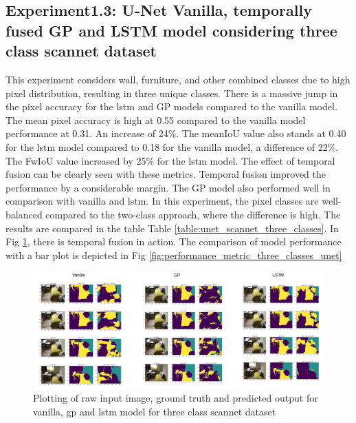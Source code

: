     \subsection{Experiment1.3: U-Net Vanilla, temporally fused GP and LSTM model considering three class scannet dataset}
	
	This experiment considers wall, furniture, and other combined classes due to high pixel distribution, resulting in three unique classes. There is a massive jump in the pixel accuracy for the lstm and GP models compared to the vanilla model. The mean pixel accuracy is high at 0.55 compared to the vanilla model performance at 0.31. An increase of 24\%. The meanIoU value also stands at 0.40 for the lstm model compared to 0.18 for the vanilla model, a difference of 22\%. The FwIoU value increased by 25\% for the lstm model. The effect of temporal fusion can be clearly seen with these metrics. Temporal fusion improved the performance by a considerable margin. The GP model also performed well in comparison with vanilla and lstm. In this experiment, the pixel classes are well-balanced compared to the two-class approach, where the difference is high. The results are compared in the table Table \ref{table:unet_scannet_three_classes}. In Fig \ref{fig:performance_metric_three_classes_scannet}, there is temporal fusion in action. The comparison of model performance with a bar plot is depicted in Fig \ref{fig:performance_metric_three_classes_unet}
	
	\begin{figure}
		\centering
		\includegraphics[width=16cm]{images/unet_scannet_three_classes.png}
		\caption{Plotting of raw input image, ground truth and predicted output for vanilla, gp and lstm model for three class scannet dataset}
		\label{fig:performance_metric_three_classes_scannet}
	\end{figure}

